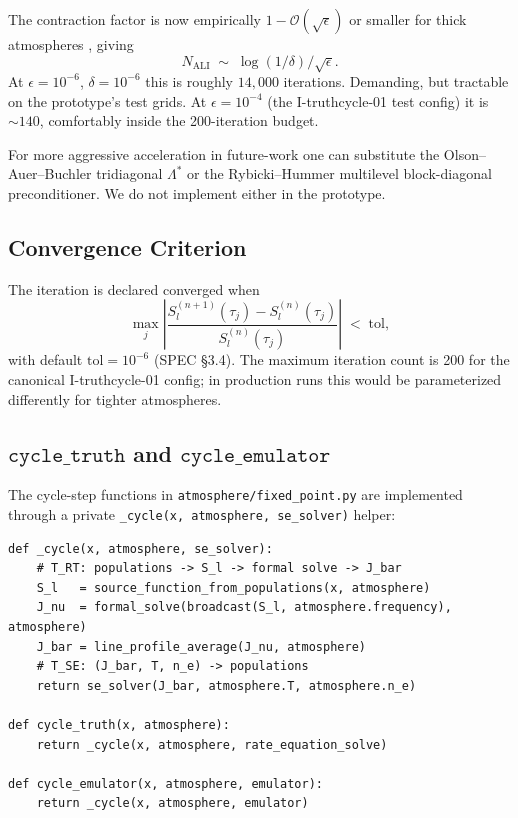 \documentclass[11pt]{article}
\newcommand{\Lstar}{\Lambda^{*}}
\newcommand{\Sl}{S_{l}}
\newcommand{\code}[1]{\texttt{#1}}
\begin{document}
The contraction factor is now empirically $1 - \mathcal{O}(\sqrt{\epsilon})$
or smaller for thick atmospheres \citep{OlsonAuerBuchler1986,Hubeny2003},
giving
\begin{equation}
N_{\text{ALI}} \;\sim\; \log(1/\delta) / \sqrt{\epsilon}.
\end{equation}
At $\epsilon = 10^{-6}$, $\delta = 10^{-6}$ this is roughly $14{,}000$
iterations.  Demanding, but tractable on the prototype's test grids.
At $\epsilon = 10^{-4}$ (the I-truthcycle-01 test config) it is
$\sim 140$, comfortably inside the 200-iteration budget.

For more aggressive acceleration in future-work one can substitute the
Olson--Auer--Buchler tridiagonal $\Lstar$ or the Rybicki--Hummer
multilevel block-diagonal preconditioner.  We do not implement either
in the prototype.

\subsection{Convergence Criterion}

The iteration is declared converged when
\begin{equation}
\max_j \left| \frac{\Sl^{(n+1)}(\tau_j) - \Sl^{(n)}(\tau_j)}{\Sl^{(n)}(\tau_j)} \right|
\;<\; \mathrm{tol},
\end{equation}
with default $\mathrm{tol} = 10^{-6}$ (SPEC §3.4).  The maximum
iteration count is 200 for the canonical I-truthcycle-01 config; in
production runs this would be parameterized differently for tighter
atmospheres.

\subsection{$\mathtt{cycle\_truth}$ and $\mathtt{cycle\_emulator}$}

The cycle-step functions in \code{atmosphere/fixed\_point.py} are
implemented through a private \code{\_cycle(x, atmosphere, se\_solver)}
helper:
\begin{lstlisting}
def _cycle(x, atmosphere, se_solver):
    # T_RT: populations -> S_l -> formal solve -> J_bar
    S_l   = source_function_from_populations(x, atmosphere)
    J_nu  = formal_solve(broadcast(S_l, atmosphere.frequency), atmosphere)
    J_bar = line_profile_average(J_nu, atmosphere)
    # T_SE: (J_bar, T, n_e) -> populations
    return se_solver(J_bar, atmosphere.T, atmosphere.n_e)

def cycle_truth(x, atmosphere):
    return _cycle(x, atmosphere, rate_equation_solve)

def cycle_emulator(x, atmosphere, emulator):
    return _cycle(x, atmosphere, emulator)
\end{lstlisting}
\end{document}
